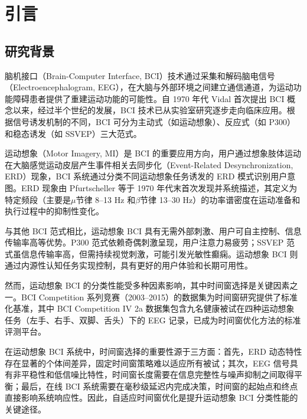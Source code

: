 
\chapter{引言}
\label{chap:introduction}

\section{研究背景}
\label{sec:background}

脑机接口（Brain-Computer Interface, BCI）技术通过采集和解码脑电信号（Electroencephalogram, EEG），在大脑与外部环境之间建立通信通道，为运动功能障碍患者提供了重建运动功能的可能性\cite{tangermann2012review}。自 1970 年代 Vidal 首次提出 BCI 概念以来\cite{vidal1973toward}，经过半个世纪的发展，BCI 技术已从实验室研究逐步走向临床应用。根据信号诱发机制的不同，BCI 可分为主动式（如运动想象）、反应式（如 P300）和稳态诱发（如 SSVEP）三大范式\cite{lotte2018review}。

运动想象（Motor Imagery, MI）是 BCI 的重要应用方向，用户通过想象肢体运动在大脑感觉运动皮层产生事件相关去同步化（Event-Related Desynchronization, ERD）现象，BCI 系统通过分类不同运动想象任务诱发的 ERD 模式识别用户意图\cite{pfurtscheller1999event}。ERD 现象由 Pfurtscheller 等于 1970 年代末首次发现并系统描述，其定义为特定频段（主要是$\mu$节律 8--13 Hz 和$\beta$节律 13--30 Hz）的功率谱密度在运动准备和执行过程中的抑制性变化\cite{pfurtscheller1999event}。

与其他 BCI 范式相比，运动想象 BCI 具有无需外部刺激、用户可自主控制、信息传输率高等优势\cite{lotte2018review}。P300 范式依赖奇偶刺激呈现，用户注意力易疲劳；SSVEP 范式虽信息传输率高，但需持续视觉刺激，可能引发光敏性癫痫。运动想象 BCI 则通过内源性认知任务实现控制，具有更好的用户体验和长期可用性\cite{lotte2018review}。

然而，运动想象 BCI 的分类性能受多种因素影响，其中时间窗选择是关键因素之一\cite{yang2015time}。BCI Competition 系列竞赛（2003--2015）的数据集为时间窗研究提供了标准化基准，其中 BCI Competition IV 2a 数据集包含九名健康被试在四种运动想象任务（左手、右手、双脚、舌头）下的 EEG 记录，已成为时间窗优化方法的标准评测平台\cite{tangermann2012review}。

在运动想象 BCI 系统中，时间窗选择的重要性源于三方面：首先，ERD 动态特性存在显著的个体间差异，固定时间窗策略难以适应所有被试\cite{zhang2019temporally}；其次，EEG 信号具有非平稳性和低信噪比特性，时间窗长度需要在信息完整性与噪声抑制之间取得平衡\cite{blankertz2008optimizing}；最后，在线 BCI 系统需要在毫秒级延迟内完成决策，时间窗的起始点和终点直接影响系统响应性\cite{tangermann2012review}。因此，自适应时间窗优化是提升运动想象 BCI 分类性能的关键途径。

